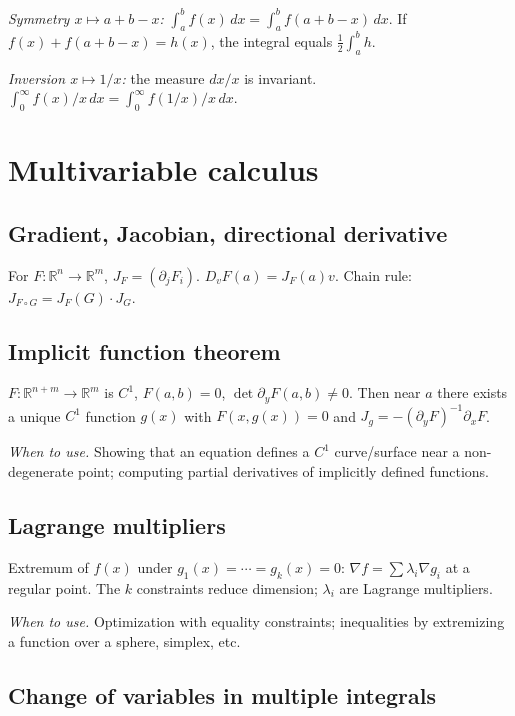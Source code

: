 \textit{Symmetry $x\mapsto a+b-x$:} $\int_a^b f(x)\,dx=\int_a^b f(a+b-x)\,dx$. If $f(x)+f(a+b-x)=h(x)$, the integral equals $\frac12\int_a^b h$.

\textit{Inversion $x\mapsto1/x$:} the measure $dx/x$ is invariant. $\int_0^\infty f(x)/x\,dx=\int_0^\infty f(1/x)/x\,dx$.

\medskip

\section{Multivariable calculus}
\label{sec:multivariable}

\subsection{Gradient, Jacobian, directional derivative}
\label{subsec:gradient-jacobian}

For $F:\mathbb{R}^n\to\mathbb{R}^m$, $J_F=(\partial_j F_i)$. $D_v F(a)=J_F(a)v$. Chain rule: $J_{F\circ G}=J_F(G)\cdot J_G$.

\subsection{Implicit function theorem}
\label{subsec:implicit-function}

$F:\mathbb{R}^{n+m}\to\mathbb{R}^m$ is $C^1$, $F(a,b)=0$, $\det\partial_y F(a,b)\neq0$. Then near $a$ there exists a unique $C^1$ function $g(x)$ with $F(x,g(x))=0$ and $J_g=-(\partial_y F)^{-1}\partial_x F$.

\textit{When to use.} Showing that an equation defines a $C^1$ curve/surface near a non-degenerate point; computing partial derivatives of implicitly defined functions.

\subsection{Lagrange multipliers}
\label{subsec:lagrange-multipliers}

Extremum of $f(x)$ under $g_1(x)=\cdots=g_k(x)=0$: $\nabla f=\sum\lambda_i\nabla g_i$ at a regular point. The $k$ constraints reduce dimension; $\lambda_i$ are Lagrange multipliers.

\textit{When to use.} Optimization with equality constraints; inequalities by extremizing a function over a sphere, simplex, etc.

\subsection{Change of variables in multiple integrals}
\label{subsec:change-variables}

